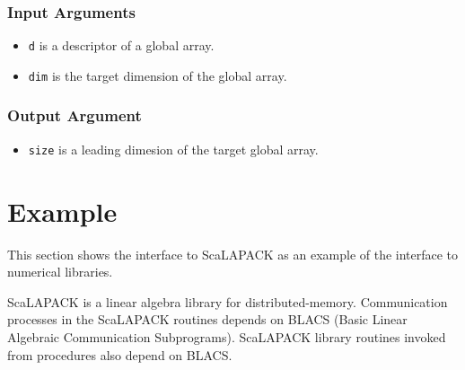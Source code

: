 \subsubsection*{Input Arguments}
\begin{itemize}
 \item {\tt d} is a descriptor of a global array.
 \item {\tt dim} is the target dimension of the global array.
\end{itemize}

\subsubsection*{Output Argument}
\begin{itemize}
 \item {\tt size} is a leading dimesion of the target global array.
\end{itemize}


\section{Example}

   This section shows the interface to ScaLAPACK as an example of the
   {\XMP} interface to numerical libraries.
   
   ScaLAPACK is a linear algebra library for distributed-memory.
   Communication processes in the ScaLAPACK routines depends on BLACS
   (Basic Linear Algebraic Communication Subprograms).
   ScaLAPACK library routines invoked from {\XMP} procedures also depend
   on BLACS. %


